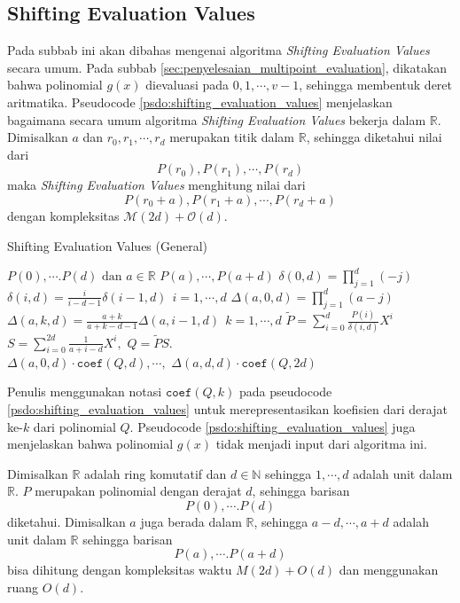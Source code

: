 \subsection{Shifting Evaluation Values}
Pada subbab ini akan dibahas mengenai algoritma \textit{Shifting Evaluation Values} secara umum. Pada subbab \ref{sec:penyelesaian_multipoint_evaluation}, dikatakan bahwa polinomial $ g(x) $ dievaluasi pada $ 0, 1, \cdots, v-1 $, sehingga membentuk deret aritmatika. Pseudocode \ref{psdo:shifting_evaluation_values} menjelaskan bagaimana secara umum algoritma \textit{Shifting Evaluation Values} bekerja dalam $ \mathbb{R} $. Dimisalkan $ a $ dan $ r_0, r_1, \cdots, r_d $ merupakan titik dalam $ \mathbb{R} $, sehingga diketahui nilai dari $$ P(r_0), P(r_1), \cdots, P(r_d) $$ maka \textit{Shifting Evaluation Values} menghitung nilai dari $$ P(r_0 + a), P(r_1 + a), \cdots, P(r_d + a) $$ dengan kompleksitas $ \mathcal{M}{(2d)} + \mathcal{O}{(d)} $.
\begin{algorithm}
	\caption{Shifting Evaluation Values (General)}
	\label{psdo:shifting_evaluation_values}
	\begin{algorithmic}[1]
		\Require $ P(0), \cdots. P(d) \text{ dan } a \in \mathbb{R} $
		\Ensure $ P(a), \cdots , P(a+d) $
		\State $ \delta(0,d) = \prod_{j=1}^d(-j) $
		\State $ \delta(i,d) = \frac{i}{i - d - 1} \delta(i-1,d)\ \ i = 1, \cdots, d$
		\State $ \Delta(a,0,d) = \prod_{j=1}^d(a-j) $
		\State $ \Delta(a,k,d) = \frac{a+k}{a+k - d - 1} \Delta(a,i-1,d)\ \ k = 1, \cdots, d $
		\State $ \tilde{P} = \sum_{i=0}^d \frac{P(i)}{\delta(i,d)} X^i $ 
		\State $ S = \sum_{i=0}^{2d} \frac{1}{a + i - d} X^i,$ 
		\State $ Q = \tilde{P}S. $ \\ 
		\Return $ \Delta(a,0,d)\cdot \texttt{coef}(Q,d), \cdots, $ $ \Delta(a,d,d)\cdot \texttt{coef}(Q,2d)  $
	\end{algorithmic}
\end{algorithm}

Penulis menggunakan notasi $ \texttt{coef}(Q,k) $ pada pseudocode \ref{psdo:shifting_evaluation_values} untuk merepresentasikan koefisien dari derajat ke-$k$ dari polinomial $Q$. Pseudocode \ref{psdo:shifting_evaluation_values} juga menjelaskan bahwa polinomial $ g(x) $ tidak menjadi input dari algoritma ini.

\begin{theo}
	\label{theo:shifting_evaluation_values}
	Dimisalkan $ \mathbb{R} $ adalah ring komutatif dan $ d \in \mathbb{N} $  sehingga $ 1, \cdots, d $ adalah unit dalam $ \mathbb{R} $. $ P $ merupakan polinomial dengan derajat $ d $, sehingga barisan 
	$$ P(0), \cdots. P(d) $$
	diketahui. Dimisalkan $ a $ juga berada dalam  $ \mathbb{R} $, sehingga $ a-d, \cdots, a+d $ adalah unit dalam $ \mathbb{R} $ sehingga barisan 
	$$ P(a), \cdots. P(a+d) $$
	bisa dihitung dengan kompleksitas waktu $ M(2d) + O(d) $ dan menggunakan ruang $ O(d) $.
\end{theo}

